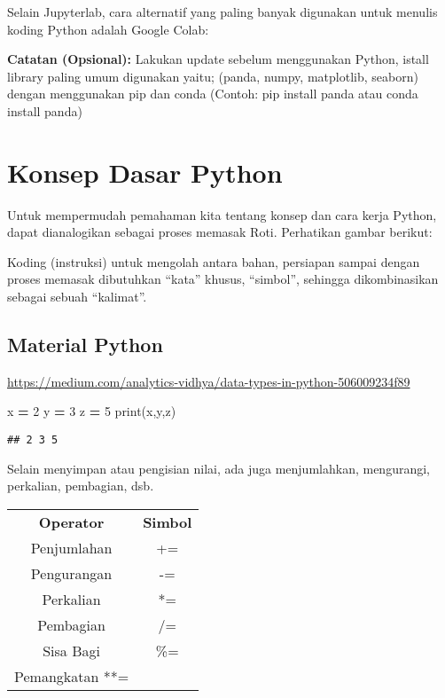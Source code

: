 \documentclass[
]{docs}
\newenvironment{Shaded}{\begin{snugshade}}{\end{snugshade}}
\newcommand{\BuiltInTok}[1]{#1}
\newcommand{\DecValTok}[1]{\textcolor[rgb]{0.00,0.00,0.81}{#1}}
\newcommand{\NormalTok}[1]{#1}
\newcommand{\OperatorTok}[1]{\textcolor[rgb]{0.81,0.36,0.00}{\textbf{#1}}}
\begin{document}
Selain Jupyterlab, cara alternatif yang paling banyak digunakan untuk menulis koding Python adalah Google Colab:

\textbf{Catatan (Opsional):} Lakukan update sebelum menggunakan Python, istall library paling umum digunakan yaitu; (panda, numpy, matplotlib, seaborn) dengan menggunakan pip dan conda (Contoh: pip install panda atau conda install panda)

\hypertarget{konsep-dasar-python}{%
\section{Konsep Dasar Python}\label{konsep-dasar-python}}

Untuk mempermudah pemahaman kita tentang konsep dan cara kerja Python, dapat dianalogikan sebagai proses memasak Roti. Perhatikan gambar berikut:

Koding (instruksi) untuk mengolah antara bahan, persiapan sampai dengan proses memasak dibutuhkan ``kata'' khusus, ``simbol'', sehingga dikombinasikan sebagai sebuah ``kalimat''.

\hypertarget{material-python}{%
\subsection{Material Python}\label{material-python}}

\url{https://medium.com/analytics-vidhya/data-types-in-python-506009234f89}

\begin{Shaded}
\begin{Highlighting}[]
\NormalTok{x }\OperatorTok{=} \DecValTok{2}
\NormalTok{y }\OperatorTok{=} \DecValTok{3} 
\NormalTok{z }\OperatorTok{=} \DecValTok{5} 
\BuiltInTok{print}\NormalTok{(x,y,z)}
\end{Highlighting}
\end{Shaded}

\begin{verbatim}
## 2 3 5
\end{verbatim}

Selain menyimpan atau pengisian nilai, ada juga menjumlahkan, mengurangi, perkalian, pembagian, dsb.

\begin{longtable}[]{@{}cc@{}}
\toprule()
\endhead
\textbf{Operator} & \textbf{Simbol} \\
Penjumlahan & += \\
Pengurangan & -= \\
Perkalian & *= \\
Pembagian & /= \\
Sisa Bagi & \%= \\
Pemangkatan **= & \\
\bottomrule()
\end{longtable}
\end{document}
